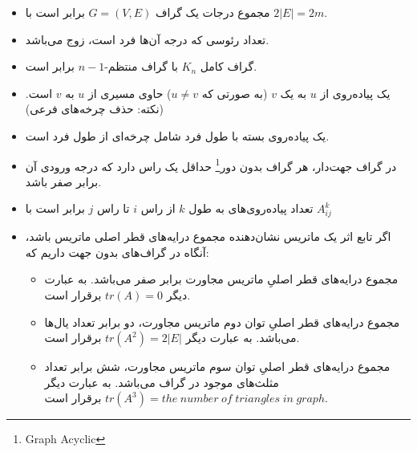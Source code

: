 \documentclass[a4paper,10pt]{article}
\begin{document}
    \begin{itemize}
        
        \item مجموع درجات یک گراف $G=(V,E)$ برابر است با $2|E|=2m$.
        
        \item تعداد رئوسی که درجه آن‌ها فرد است، زوج می‌باشد.

        \item گراف کامل $K_n$ با گراف منتظم-$n-1$ برابر است.

        \item یک پیاده‌روی از $u$ به یک $v$ (به صورتی که $u \neq v$) حاوی مسیری از $u$ به $v$ است. (نکته: حذف چرخه‌های فرعی)

        \item یک پیاده‌روی بسته با طول فرد شامل چرخه‌ای از طول فرد است.

        \item در گراف جهت‌دار، هر گراف بدون دور\footnote{\hspace{2pt}Graph Acyclic} حداقل یک راس دارد که درجه ورودی آن برابر صفر باشد.

        \item تعداد پیاده‌روی‌های به طول $k$ از راس $i$ تا راس $j$ برابر است با $A^k_{ij}$

        \item اگر تابع اثر یک ماتریس نشان‌دهنده مجموع درایه‌های قطر اصلی ماتریس باشد، آنگاه در گراف‌های بدون جهت داریم که:
        
            \begin{itemize}
                
                \item مجموع درایه‌های قطر اصلیِ ماتریس مجاورت برابر صفر می‌باشد. به عبارت دیگر $tr(A)=0$ برقرار است.
                
                \item مجموع درایه‌های قطر اصلیِ توان دوم ماتریس مجاورت، دو برابر تعداد یال‌ها می‌باشد. به عبارت دیگر $tr(A^2)=2|E|$ برقرار است.
                
                \item مجموع درایه‌های قطر اصلیِ توان سوم ماتریس مجاورت، شش برابر تعداد مثلث‌های موجود در گراف می‌باشد. به عبارت دیگر $tr(A^3)=the \hspace{3pt} number \hspace{3pt} of \hspace{3pt} triangles \hspace{3pt} in \hspace{3pt} graph$ برقرار است.

            \end{itemize}

    \end{itemize}
\end{document}
